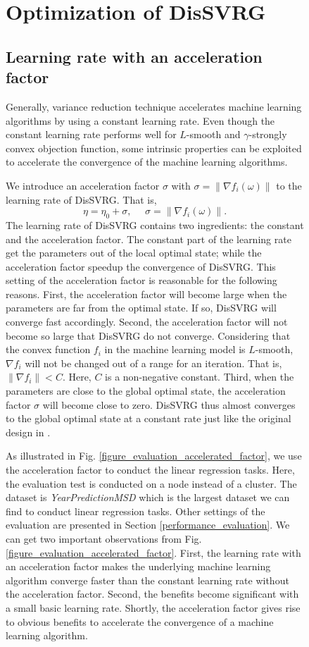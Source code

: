 \documentclass[preprint,review,11pt,a4paper]{elsarticle}
\begin{document}
\begin{figure}
\section{Optimization of DisSVRG}
\label{optimization_sgd}
\subsection{Learning rate with an acceleration factor}
Generally, variance reduction technique accelerates machine learning algorithms by using a constant learning rate. Even though the constant learning rate performs well for $L$-smooth and $\gamma$-strongly convex objection function, some intrinsic properties can be exploited to accelerate the convergence of the machine learning algorithms.

We introduce an acceleration factor $\sigma$ with $\sigma=\parallel \nabla f_i(\omega)\parallel$ to the learning rate of DisSVRG. That is,
\begin{equation}
\eta=\eta_0+\sigma,~~~~~~\sigma=\parallel \nabla f_i(\omega)\parallel.
\end{equation}
The learning rate of DisSVRG contains two ingredients: the constant and the acceleration factor. The constant part of the learning rate get the parameters out of the local optimal state; while the acceleration factor speedup the convergence of DisSVRG. This setting of the acceleration factor is reasonable for the following reasons. First, the acceleration factor will become large when the parameters are far from the optimal state. If so, DisSVRG will converge fast accordingly. Second, the acceleration factor will not become so large that DisSVRG do not converge. Considering that the convex function $f_i$ in the machine learning model is $L$-smooth, $\nabla f_i$ will not be changed out of  a range for an iteration. That is, $\parallel\nabla f_i\parallel<C$. Here, $C$ is a non-negative constant. Third, when the parameters are close to the global optimal state, the acceleration factor $\sigma$ will become close to zero. DisSVRG thus almost converges to the global optimal state at a constant rate just like the original design in \cite{Johnson:9MAvkbgy}.

As illustrated in Fig. \ref{figure_evaluation_accelerated_factor}, we use the acceleration factor to conduct the linear regression tasks. Here, the evaluation test is conducted on a node instead of a cluster. The dataset is \emph{YearPredictionMSD} which is the largest dataset we can find to conduct linear regression tasks. Other settings of the evaluation are presented in Section \ref{performance_evaluation}.  We can get two important observations from Fig. \ref{figure_evaluation_accelerated_factor}. First, the learning rate with an acceleration factor makes the underlying machine learning algorithm converge faster than the constant learning rate without the acceleration factor. Second, the benefits become significant with a small basic learning rate. Shortly, the acceleration factor gives rise to obvious benefits to accelerate the convergence of a machine learning algorithm.


\end{figure}
\end{document}
